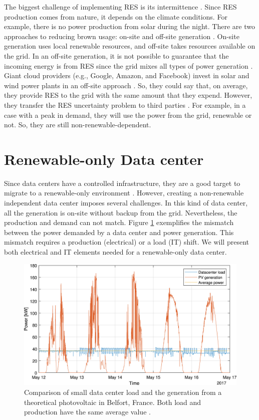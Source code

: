 The biggest challenge of implementing RES is its intermittence \cite{rostirolla2022survey}. Since RES production comes from nature, it depends on the climate conditions. For example, there is no power production from solar during the night. There are two approaches to reducing brown usage: on-site and off-site generation \cite{ren2012carbon}. On-site generation uses local renewable resources, and off-site takes resources available on the grid. In an off-site generation, it is not possible to guarantee that the incoming energy is from RES since the grid mixes all types of power generation \cite{rostirolla2022survey}. Giant cloud providers (e.g., Google, Amazon, and Facebook) invest in solar and wind power plants in an off-site approach \cite{Masanet984, branscombe2020google, amazon2023}. So, they could say that, on average, they provide RES to the grid with the same amount that they expend. However, they transfer the RES uncertainty problem to third parties \cite{rostirolla2022survey}. For example, in a case with a peak in demand, they will use the power from the grid, renewable or not. So, they are still non-renewable-dependent.

\section{Renewable-only Data center}
Since data centers have a controlled infrastructure, they are a good target to migrate to a renewable-only environment \cite{rostirolla2022survey}. However, creating a non-renewable independent data center imposes several challenges. In this kind of data center, all the generation is on-site without backup from the grid. Nevertheless, the production and demand can not match. Figure \ref{fig:load_production} exemplifies the mismatch between the power demanded by a data center and power generation. This mismatch requires a production (electrical) or a load (IT) shift. We will present both electrical and IT elements needed for a renewable-only data center.

\begin{figure}[!htb]
    \centering
    \includegraphics[scale=1]{Images/Related_works/load_production.jpg}
    \caption{Comparison of small data center load and the generation from a theoretical photovoltaic in Belfort, France. Both load and production have the same average value \cite{rostirolla2022survey}.}
    \label{fig:load_production}
\end{figure}

